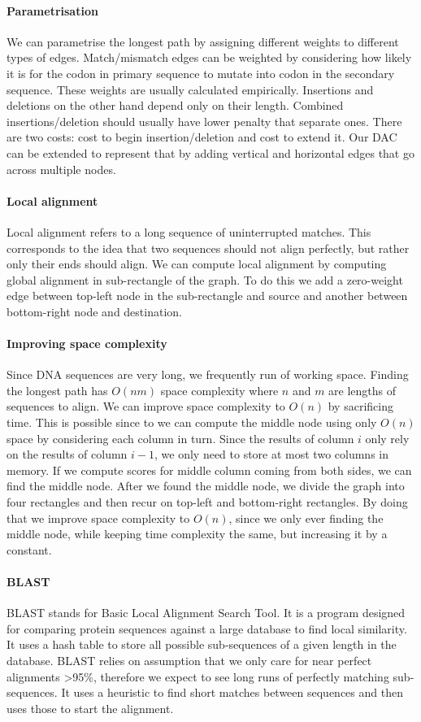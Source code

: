 \documentclass{report}
\begin{document}
\paragraph{Parametrisation}
We can parametrise the longest path by assigning different weights to different types of edges.
Match/mismatch edges can be weighted by considering how likely it is for the codon in primary sequence to mutate into codon in the secondary sequence.
These weights are usually calculated empirically.
Insertions and deletions on the other hand depend only on their length.
Combined insertions/deletion should usually have lower penalty that separate ones.
There are two costs: cost to begin insertion/deletion and cost to extend it.
Our DAC can be extended to represent that by adding vertical and horizontal edges that go across multiple nodes.
\paragraph{Local alignment}
Local alignment refers to a long sequence of uninterrupted matches.
This corresponds to the idea that two sequences should not align perfectly, but rather only their ends should align.
We can compute local alignment by computing global alignment in sub-rectangle of the graph.
To do this we add a zero-weight edge between top-left node in the sub-rectangle and source and another between bottom-right node and destination.
\paragraph{Improving space complexity}
Since DNA sequences are very long, we frequently run of working space.
Finding the longest path has $O(nm)$ space complexity where $n$ and $m$ are lengths of sequences to align.
We can improve space complexity to $O(n)$ by sacrificing time.
This is possible since to we can compute the middle node using only $O(n)$ space by considering each column in turn.
Since the results of column $i$ only rely on the results of column $i-1$, we only need to store at most two columns in memory.
If we compute scores for middle column coming from both sides, we can find the middle node.
After we found the middle node, we divide the graph into four rectangles and then recur on top-left and bottom-right rectangles.
By doing that we improve space complexity to $O(n)$, since we only ever finding the middle node, while keeping time complexity the same, but increasing it by a constant.
\paragraph{BLAST}
BLAST stands for Basic Local Alignment Search Tool.
It is a program designed for comparing protein sequences against a large database to find local similarity.
It uses a hash table to store all possible sub-sequences of a given length in the database.
BLAST relies on assumption that we only care for near perfect alignments >95\%, therefore we expect to see long runs of perfectly matching sub-sequences.
It uses a heuristic to find short matches between sequences and then uses those to start the alignment.
\end{document}

